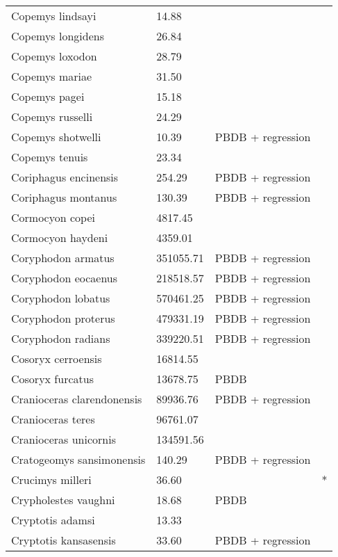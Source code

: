 \documentclass{article}
\begin{document}
\begin{center}
\begin{longtable}{p{} p{} p{} p{}}
    Copemys lindsayi & 14.88 & \cite{Tomiya2013} &  \\ 
    Copemys longidens & 26.84 & \cite{Tomiya2013} &  \\ 
    Copemys loxodon & 28.79 & \cite{Tomiya2013} &  \\ 
    Copemys mariae & 31.50 & \cite{Tomiya2013} &  \\ 
    Copemys pagei & 15.18 & \cite{Tomiya2013} &  \\ 
    Copemys russelli & 24.29 & \cite{Tomiya2013} &  \\ 
    Copemys shotwelli & 10.39 & PBDB + regression &  \\ 
    Copemys tenuis & 23.34 & \cite{Tomiya2013} &  \\ 
    Coriphagus encinensis & 254.29 & PBDB + regression &  \\ 
    Coriphagus montanus & 130.39 & PBDB + regression &  \\ 
    Cormocyon copei & 4817.45 & \cite{Tomiya2013} &  \\ 
    Cormocyon haydeni & 4359.01 & \cite{Tomiya2013} &  \\ 
    Coryphodon armatus & 351055.71 & PBDB + regression &  \\ 
    Coryphodon eocaenus & 218518.57 & PBDB + regression &  \\ 
    Coryphodon lobatus & 570461.25 & PBDB + regression &  \\ 
    Coryphodon proterus & 479331.19 & PBDB + regression &  \\ 
    Coryphodon radians & 339220.51 & PBDB + regression &  \\ 
    Cosoryx cerroensis & 16814.55 & \cite{Tomiya2013} &  \\ 
    Cosoryx furcatus & 13678.75 & PBDB &  \\ 
    Cranioceras clarendonensis & 89936.76 & PBDB + regression &  \\ 
    Cranioceras teres & 96761.07 & \cite{Tomiya2013} &  \\ 
    Cranioceras unicornis & 134591.56 & \cite{Tomiya2013} &  \\ 
    Cratogeomys sansimonensis & 140.29 & PBDB + regression &  \\ 
    Crucimys milleri & 36.60 & \cite{Tomiya2013} & * \\ 
    Crypholestes vaughni & 18.68 & PBDB &  \\ 
    Cryptotis adamsi & 13.33 & \cite{Tomiya2013} &  \\ 
    Cryptotis kansasensis & 33.60 & PBDB + regression &  \\ 

\end{longtable}
\end{center}
\end{document}
